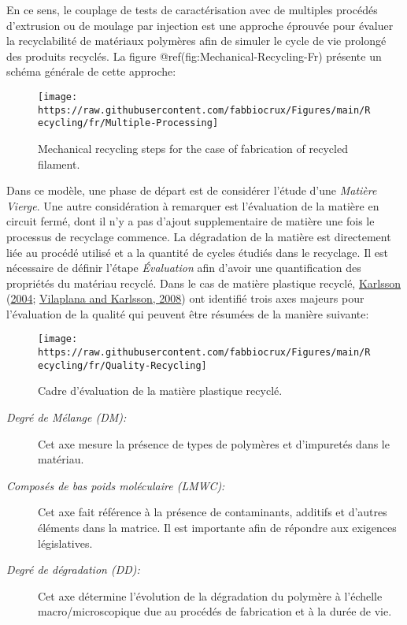 \documentclass[
]{article}
\begin{document}
En ce sens, le couplage de tests de caractérisation avec de multiples
procédés d'extrusion ou de moulage par injection est une approche
éprouvée pour évaluer la recyclabilité de matériaux polymères afin de
simuler le cycle de vie prolongé des produits recyclés. La figure
@ref(fig:Mechanical-Recycling-Fr) présente un schéma générale de cette
approche:

\begin{figure}

{\centering \texttt{[image: https://raw.githubusercontent.com/fabbiocrux/Figures/main/Recycling/fr/Multiple-Processing]} 

}

\caption{Mechanical recycling steps for the case of fabrication of recycled filament.}\label{fig:Mechanical-Recycling-Fr}
\end{figure}

Dans ce modèle, une phase de départ est de considérer l'étude d'une
\emph{Matière Vierge}. Une autre considération à remarquer est
l'évaluation de la matière en circuit fermé, dont il n'y a pas d'ajout
supplementaire de matière une fois le processus de recyclage commence.
La dégradation de la matière est directement liée au procédé utilisé et
a la quantité de cycles étudiés dans le recyclage. Il est nécessaire de
définir l'étape \emph{Évaluation} afin d'avoir une quantification des
propriétés du matériau recyclé. Dans le cas de matière plastique
recyclé, \protect\hyperlink{ref-Karlsson2004}{Karlsson}
(\protect\hyperlink{ref-Karlsson2004}{2004};
\protect\hyperlink{ref-Vilaplana2008}{Vilaplana and Karlsson, 2008}) ont
identifié trois axes majeurs pour l'évaluation de la qualité qui peuvent
être résumées de la manière suivante:

\begin{figure}

{\centering \texttt{[image: https://raw.githubusercontent.com/fabbiocrux/Figures/main/Recycling/fr/Quality-Recycling]} 

}

\caption{Cadre d'évaluation de la matière plastique recyclé.}\label{fig:Quality-Recycling-Fr}
\end{figure}

\begin{description}
\item[\emph{Degré de Mélange (DM):}]
Cet axe mesure la présence de types de polymères et d'impuretés dans le
matériau.
\item[\emph{Composés de bas poids moléculaire (LMWC):}]
Cet axe fait référence à la présence de contaminants, additifs et
d'autres éléments dans la matrice. Il est importante afin de répondre
aux exigences législatives.
\item[\emph{Degré de dégradation (DD):}]
Cet axe détermine l'évolution de la dégradation du polymère à l'échelle
macro/microscopique due au procédés de fabrication et à la durée de vie.
\end{description}
\end{document}
